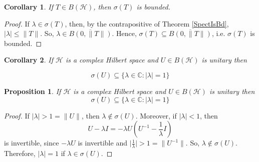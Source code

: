\documentclass{beamer}
\newtheorem{cor}{Corollary}
\newtheorem{prop}{Proposition}
\begin{document}
  \begin{frame}{\subsecname}
    \begin{cor} \label{SpectIsBd2}
      If $T\in B(\mathcal{H})$, then $\sigma(T)$ is bounded.
    \end{cor}
  \end{frame}

  \begin{frame}{\subsecname}
    \begin{proof}
      If $\lambda\in\sigma(T)$, then, by the contrapositive of Theorem \ref{SpectIsBd}, $|\lambda|\leq\lVert T\rVert$. So, $\lambda\in\overline{B(0,\lVert T\rVert)}$. Hence, $\sigma(T)\subseteq\overline{B(0,\lVert T\rVert)}$, i.e. $\sigma(T)$ is bounded.
    \end{proof}
  \end{frame}


  \begin{frame}{\subsecname}
    \begin{cor}
    If $\mathcal{H}$ is a complex Hilbert space and $U \in B(\mathcal{H})$ is unitary then

    $$
    \sigma(U) \subseteq\{\lambda \in \mathbb{C}:|\lambda|=1\}
    $$
    \end{cor}
  \end{frame}

  \begin{frame}{\subsecname}
    \begin{prop}
    If $\mathcal{H}$ is a complex Hilbert space and $U \in B(\mathcal{H})$ is unitary then
    $$
    \sigma(U) \subseteq\{\lambda \in \mathbb{C}:|\lambda|=1\}
    $$
    \end{prop}
    \begin{proof}
    If $|\lambda|>1=\lVert U\rVert$, then $\lambda\notin\sigma(U)$. Moreover, if $|\lambda|<1$, then
    $$
    U-\lambda I = -\lambda U(U^{-1}-\frac{1}{\lambda}I)
    $$
    is invertible, since $-\lambda U$ is invertible and $\Big|\frac{1}{\lambda}\Big|>1=\lVert U^{-1}\rVert$. So, $\lambda\notin\sigma(U)$. Therefore, $|\lambda|=1$ if $\lambda\in\sigma(U)$.
    \end{proof}
  \end{frame}
\end{document}
